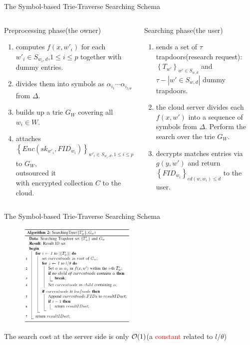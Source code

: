 \documentclass{beamer}
\begin{document}
\begin{frame}{The Symbol-based Trie-Traverse Searching Schema}
		\begin{columns}
			\begin{exampleblock}{Preprocessing phase(the owner)}
		\begin{enumerate}
			\item 	computes ${f(x,w{'_i})}$ for each ${w{'_i} \in {S_{{w_i},d}}}$,${1 \le i \le p}$ together with dummy entries.
			\item divides them into symbols as ${\alpha _{{i_1}}} \cdots {\alpha _{{i_{l/\theta }}}}$ from $\Delta$.
			\item builds up a trie ${G_W}$ covering all ${w_i} \in W$.
			\item attaches ${\left\{ {Enc(s{k_{w{'_i}}},FI{D_{{w_i}}})} \right\}_{w{'_i} \in {S_{{w_i},d}},1 \le i \le p}}$ to $G_W$,\\outsourced it\\ with encrypted collection $C$ to the cloud.
			
			
		\end{enumerate}
			\end{exampleblock}
			
			\begin{alertblock}{Searching phase(the user)}
			 \begin{enumerate}
			 	\item sends a set of $\tau $ trapdoors(research request): ${\left\{ {{T_{w'}}} \right\}_{w' \in {S_{w,d}}}}$ and $\tau  - \left| {w' \in {S_{w,d}}} \right|$ dummy trapdoors.
			 	\item the cloud server divides each $f(x,w')$ into a sequence of symbols from $\Delta$. Perform the search over the trie $G_W$.
			 	\item decrypts matches entries via $g(y,w')$ and return ${\left\{ {FI{D_{{w_i}}}} \right\}_{ed(w,{w_i}) \le d}}$ to the user.
			 \end{enumerate}
			\end{alertblock}
		\end{columns}
\end{frame}

\begin{frame}{The Symbol-based Trie-Traverse Searching Schema}
	\begin{figure}
		\includegraphics[width=0.5\textwidth]{algo2.jpg}
	\end{figure}
	The search cost at the server side is only \textcolor{red}{${\cal O}(1)$}(a \textcolor{red}{constant} related to $l/\theta$)
\end{frame}
\end{document}
